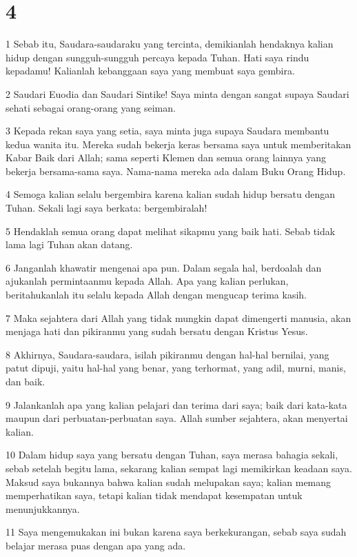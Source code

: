 \chapter{4}

\par 1 Sebab itu, Saudara-saudaraku yang tercinta, demikianlah hendaknya kalian hidup dengan sungguh-sungguh percaya kepada Tuhan. Hati saya rindu kepadamu! Kalianlah kebanggaan saya yang membuat saya gembira.
\par 2 Saudari Euodia dan Saudari Sintike! Saya minta dengan sangat supaya Saudari sehati sebagai orang-orang yang seiman.
\par 3 Kepada rekan saya yang setia, saya minta juga supaya Saudara membantu kedua wanita itu. Mereka sudah bekerja keras bersama saya untuk memberitakan Kabar Baik dari Allah; sama seperti Klemen dan semua orang lainnya yang bekerja bersama-sama saya. Nama-nama mereka ada dalam Buku Orang Hidup.
\par 4 Semoga kalian selalu bergembira karena kalian sudah hidup bersatu dengan Tuhan. Sekali lagi saya berkata: bergembiralah!
\par 5 Hendaklah semua orang dapat melihat sikapmu yang baik hati. Sebab tidak lama lagi Tuhan akan datang.
\par 6 Janganlah khawatir mengenai apa pun. Dalam segala hal, berdoalah dan ajukanlah permintaanmu kepada Allah. Apa yang kalian perlukan, beritahukanlah itu selalu kepada Allah dengan mengucap terima kasih.
\par 7 Maka sejahtera dari Allah yang tidak mungkin dapat dimengerti manusia, akan menjaga hati dan pikiranmu yang sudah bersatu dengan Kristus Yesus.
\par 8 Akhirnya, Saudara-saudara, isilah pikiranmu dengan hal-hal bernilai, yang patut dipuji, yaitu hal-hal yang benar, yang terhormat, yang adil, murni, manis, dan baik.
\par 9 Jalankanlah apa yang kalian pelajari dan terima dari saya; baik dari kata-kata maupun dari perbuatan-perbuatan saya. Allah sumber sejahtera, akan menyertai kalian.
\par 10 Dalam hidup saya yang bersatu dengan Tuhan, saya merasa bahagia sekali, sebab setelah begitu lama, sekarang kalian sempat lagi memikirkan keadaan saya. Maksud saya bukannya bahwa kalian sudah melupakan saya; kalian memang memperhatikan saya, tetapi kalian tidak mendapat kesempatan untuk menunjukkannya.
\par 11 Saya mengemukakan ini bukan karena saya berkekurangan, sebab saya sudah belajar merasa puas dengan apa yang ada.
